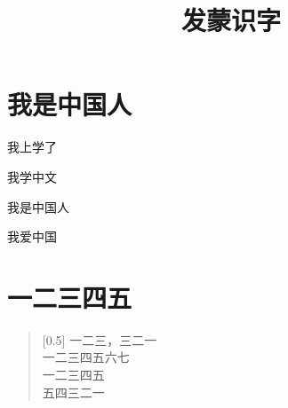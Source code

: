\documentclass[12pt,UTF-8,openany]{ctexbook}
\title{\zihao{0} \bfseries 发蒙识字}
\author{}
\date{}
\begin{document}
\maketitle
\tableofcontents
\newpage

\chapter{我是中国人}

\begin{large}
    
    我上学了
    
    我学中文
    
    我是中国人
    
    我爱中国
    
\end{large}


\clearpage

\begin{center}
    
\end{center}


\hanzibox{}\hanzibox{}\hanzibox{}\hanzibox{}\hspace{1em}\hanzibox{}\hanzibox{}\hanzibox{}\hanzibox{}

\hanzibox{}\hanzibox{}\hanzibox{}\hanzibox{}\hspace{1em}\hanzibox{}\hanzibox{}\hanzibox{}\hanzibox{}






\chapter{一二三四五}

\begin{large}
    
    \begin{verse}[0.5\linewidth]
        一二三，三二一 \\
        一二三四五六七 \\
        一二三四五 \\
        五四三二一
    \end{verse}
    
\end{large}


\clearpage

\begin{center}
    
\end{center}
\end{document}
